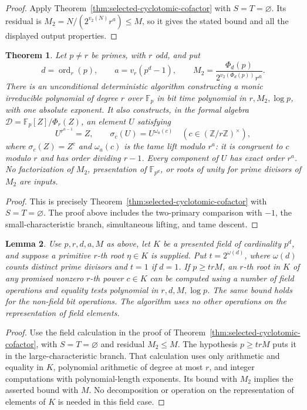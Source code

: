\documentclass[11pt]{article}
\newtheorem{theorem}{Theorem}[section]
\newtheorem{lemma}[theorem]{Lemma}
\theoremstyle{definition}
\theoremstyle{remark}
\begin{document}
\begin{proof}
Apply Theorem~\ref{thm:selected-cyclotomic-cofactor} with
\(S=T=\varnothing\). Its residual is
\(M_2=N/(2^{v_2(N)}r^a)\le M\), so it gives the stated
bound and all the displayed output properties.
\end{proof}

\begin{theorem}\label{cor:two-primary-cyclotomic-cofactor}
Let \(p\ne r\) be primes, with \(r\) odd, and put
\[
 d=\operatorname{ord}_r(p),\qquad
 a=v_r(p^d-1),\qquad
 M_2=\frac{\Phi_d(p)}{2^{v_2(\Phi_d(p))}r^a}.
\]
There is an unconditional deterministic algorithm constructing
a monic irreducible polynomial of degree \(r\) over
\(\mathbb F_p\) in bit time polynomial in \(r,M_2,\log p\),
with one absolute exponent. It also constructs, in the formal
algebra \(\mathcal D=\mathbb F_p[Z]/\Phi_r(Z)\), an element
\(U\) satisfying
\[
 U^{r^{a-1}}=Z,\qquad
 \sigma_c(U)=U^{\omega_a(c)}
           \quad(c\in(\mathbb Z/r\mathbb Z)^\times),
\]
where \(\sigma_c(Z)=Z^c\) and \(\omega_a(c)\) is the tame
lift modulo \(r^a\): it is congruent to \(c\) modulo \(r\)
and has order dividing \(r-1\). Every component of \(U\) has exact
order \(r^a\). No factorization of \(M_2\), presentation of
\(\mathbb F_{p^d}\), or roots of unity for prime divisors of
\(M_2\) are inputs.
\end{theorem}

\begin{proof}
This is precisely Theorem~\ref{thm:selected-cyclotomic-cofactor}
with \(S=T=\varnothing\). The proof above includes the
two-primary comparison with \(-1\), the small-characteristic
branch, simultaneous lifting, and tame descent.
\end{proof}

\begin{lemma}\label{lem:projected-primary-root-extraction}
Use \(p,r,d,a,M\) as above, let \(K\) be a presented field
of cardinality \(p^d\), and suppose a primitive \(r\)-th
root \(\eta\in K\) is supplied. Put
\(t=2^{\omega(d)}\), where \(\omega(d)\) counts distinct
prime divisors and \(t=1\) if \(d=1\).
If \(p\geq trM\), an \(r\)-th root in \(K\) of any
promised nonzero \(r\)-th power \(c\in K\) can be computed
using a number of field operations and equality tests
polynomial in \(r,d,M,\log p\). The same bound holds for
the non-field bit operations. The algorithm uses no other
operations on the representation of field elements.
\end{lemma}

\begin{proof}
Use the field calculation in the proof of
Theorem~\ref{thm:selected-cyclotomic-cofactor}, with
\(S=T=\varnothing\) and residual \(M_2\le M\).
The hypothesis \(p\ge trM\) puts it in the large-characteristic
branch. That calculation uses only arithmetic and equality in
\(K\), polynomial arithmetic of degree at most \(r\), and
integer computations with polynomial-length exponents. Its bound
with \(M_2\) implies the asserted bound with \(M\).
No decomposition or operation on the representation of elements
of \(K\) is needed in this field case.
\end{proof}
\end{document}
